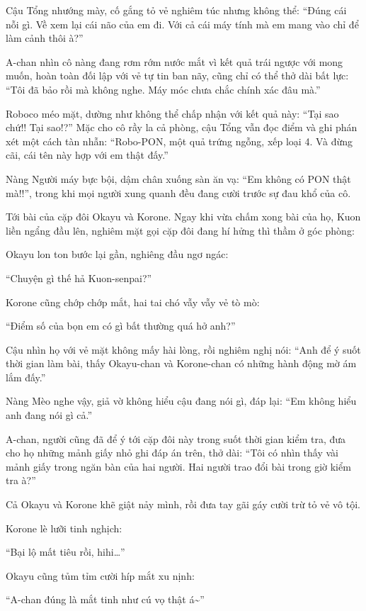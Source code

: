 \documentclass[../main.tex]{subfiles}
\begin{document}
Cậu Tổng nhướng mày, cố gắng tỏ vẻ nghiêm túc nhưng không thể: ``Đúng cái nỗi gì. Về xem lại cái não của em đi. Với cả cái máy tính mà em mang vào chỉ để làm cảnh thôi à?''

A-chan nhìn cô nàng đang rơm rớm nước mắt vì kết quả trái ngược với mong muốn, hoàn toàn đối lập với vẻ tự tin ban nãy, cũng chỉ có thể thở dài bất lực: ``Tôi đã bảo rồi mà không nghe. Máy móc chưa chắc chính xác đâu mà.''

Roboco méo mặt, dường như không thể chấp nhận với kết quả này: ``Tại sao chứ!! Tại sao!?'' Mặc cho cô rầy la cả phòng, cậu Tổng vẫn đọc điểm và ghi phán xét một cách tàn nhẫn: ``Robo-PON, một quả trứng ngỗng, xếp loại 4. Và đừng cãi, cái tên này hợp với em thật đấy.''

Nàng Người máy bực bội, dậm chân xuống sàn ăn vạ: ``Em không có PON thật mà!!'', trong khi mọi người xung quanh đều đang cười trước sự đau khổ của cô.

\ct

Tới bài của cặp đôi Okayu và Korone. Ngay khi vừa chấm xong bài của họ, Kuon liền ngẩng đầu lên, nghiêm mặt gọi cặp đôi đang hí hửng thì thầm ở góc phòng:

Okayu lon ton bước lại gần, nghiêng đầu ngơ ngác:

``Chuyện gì thế hả Kuon-senpai?''

Korone cũng chớp chớp mắt, hai tai chó vẫy vẫy vẻ tò mò:

``Điểm số của bọn em có gì bất thường quá hở anh?''

Cậu nhìn họ với vẻ mặt không mấy hài lòng, rồi nghiêm nghị nói: ``Anh để ý suốt thời gian làm bài, thấy Okayu-chan và Korone-chan có những hành động mờ ám lắm đấy.''

Nàng Mèo nghe vậy, giả vờ không hiểu cậu đang nói gì, đáp lại: ``Em không hiểu anh đang nói gì cả.''

A-chan, người cũng đã để ý tới cặp đôi này trong suốt thời gian kiểm tra, đưa cho họ những mảnh giấy nhỏ ghi đáp án trên, thở dài: ``Tôi có nhìn thấy vài mảnh giấy trong ngăn bàn của hai người. Hai người trao đổi bài trong giờ kiểm tra à?''

Cả Okayu và Korone khẽ giật nảy mình, rồi đưa tay gãi gáy cười trừ tỏ vẻ vô tội.

Korone lè lưỡi tinh nghịch:

``Bại lộ mất tiêu rồi, hihi\dots''

Okayu cũng tủm tỉm cười híp mắt xu nịnh:

``A-chan đúng là mắt tinh như cú vọ thật á\~{}''
\end{document}

